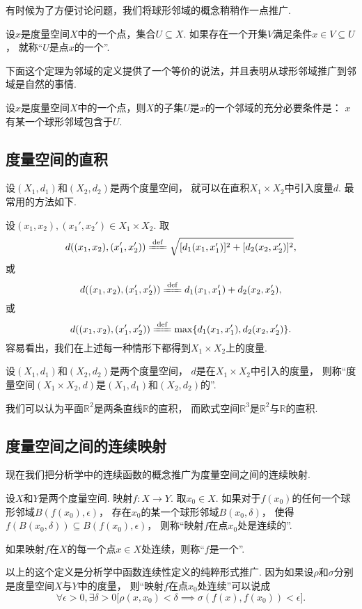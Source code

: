 有时候为了方便讨论问题，我们将球形邻域的概念稍稍作一点推广.
\begin{definition}\label{definition:度量空间.邻域的概念}
设\(x\)是度量空间\(X\)中的一个点，集合\(U \subseteq X\).
如果存在一个开集\(V\)满足条件\(x \in V \subseteq U\)，
就称“\(U\)是点\(x\)的一个”.
\end{definition}
下面这个定理为邻域的定义提供了一个等价的说法，并且表明从球形邻域推广到邻域是自然的事情.
\begin{theorem}
设\(x\)是度量空间\(X\)中的一个点，则\(X\)的子集\(U\)是\(x\)的一个邻域的充分必要条件是：
\(x\)有某一个球形邻域包含于\(U\).
\end{theorem}

\subsection{度量空间的直积}
\begingroup
\def\A{X_1}\def\B{X_2}
\def\dA{d_1}\def\dB{d_2}
\def\X{(x_1,x_2)}
\def\Y{(x_1',x_2')}
\def\dAA{d_1(x_1,x_1')}
\def\dBB{d_2(x_2,x_2')}
设\((X_1,d_1)\)和\((X_2,d_2)\)是两个度量空间，
就可以在直积\(X_1 \times X_2\)中引入度量\(d\).
最常用的方法如下.

设\(\X,\Y\in X_1 \times X_2\).
取\[
	d(\X,\Y)
	\defeq
	\sqrt{[\dAA]^2+[\dBB]^2},
\]
或\[
	d(\X,\Y)
	\defeq
	\dAA+\dBB,
\]
或\[
	d(\X,\Y)
	\defeq
	\max\{\dAA,\dBB\}.
\]
容易看出，我们在上述每一种情形下都得到\(X_1 \times X_2\)上的度量.

\begin{definition}
设\((X_1,d_1)\)和\((X_2,d_2)\)是两个度量空间，
\(d\)是在\(X_1 \times X_2\)中引入的度量，
则称“度量空间\((X_1 \times X_2,d)\)是\((X_1,d_1)\)和\((X_2,d_2)\)的”.
\end{definition}

\begin{example}
我们可以认为平面\(\mathbb{R}^2\)是两条直线\(\mathbb{R}\)的直积，
而欧式空间\(\mathbb{R}^3\)是\(\mathbb{R}^2\)与\(\mathbb{R}\)的直积.
\end{example}
\endgroup

\subsection{度量空间之间的连续映射}
现在我们把分析学中的连续函数的概念推广为度量空间之间的连续映射.

\begin{definition}\label{definition:度量空间.连续映射的概念}
设\(X\)和\(Y\)是两个度量空间.
映射\(f\colon X \to Y\).
取\(x_0 \in X\).
如果对于\(f(x_0)\)的任何一个球形邻域\(B(f(x_0),\epsilon)\)，
存在\(x_0\)的某一个球形邻域\(B(x_0,\delta)\)，
使得\(f(B(x_0,\delta)) \subseteq B(f(x_0),\epsilon)\)，
则称“映射\(f\)在点\(x_0\)处是连续的”.

如果映射\(f\)在\(X\)的每一个点\(x \in X\)处连续，则称“\(f\)是一个”.
\end{definition}
以上的这个定义是分析学中函数连续性定义的纯粹形式推广.
因为如果设\(\rho\)和\(\sigma\)分别是度量空间\(X\)与\(Y\)中的度量，
则“映射\(f\)在点\(x_0\)处连续”可以说成\[
\forall\epsilon>0,
\exists\delta>0
\bigl[
\rho(x,x_0)<\delta
\implies
\sigma(f(x),f(x_0))<\epsilon
\bigr].
\]

